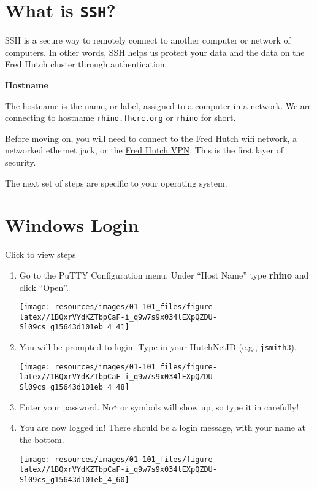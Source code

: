 \documentclass[
]{book}
\begin{document}
\hypertarget{what-is-ssh}{%
\section{\texorpdfstring{What is \texttt{SSH}?}{What is SSH?}}\label{what-is-ssh}}

SSH is a secure way to remotely connect to another computer or network of computers. In other words, SSH helps us protect your data and the data on the Fred Hutch cluster through authentication.

\textbf{Hostname}

The hostname is the name, or label, assigned to a computer in a network. We are connecting to hostname \texttt{rhino.fhcrc.org} or \texttt{rhino} for short.

Before moving on, you will need to connect to the Fred Hutch wifi network, a networked ethernet jack, or the \href{https://centernet.fredhutch.org/cn/u/center-it/help-desk/vpn.html}{Fred Hutch VPN}. This is the first layer of security.

The next set of steps are specific to your operating system.

\hypertarget{windows-login}{%
\section{Windows Login}\label{windows-login}}

Click to view steps

\begin{enumerate}
\def\labelenumi{\arabic{enumi}.}
\item
  Go to the PuTTY Configuration menu. Under ``Host Name'' type \textbf{rhino} and click ``Open''.

  \texttt{[image: resources/images/01-101\_files/figure-latex//1BQxrVYdKZTbpCaF-i\_q9w7s9x034lEXpQZDU-Sl09cs\_g15643d101eb\_4\_41]}
\item
  You will be prompted to login. Type in your HutchNetID (e.g., \texttt{jsmith3}).

  \texttt{[image: resources/images/01-101\_files/figure-latex//1BQxrVYdKZTbpCaF-i\_q9w7s9x034lEXpQZDU-Sl09cs\_g15643d101eb\_4\_48]}
\item
  Enter your password. No\texttt{*} or symbols will show up, so type it in carefully!
\item
  You are now logged in! There should be a login message, with your name at the bottom.

  \texttt{[image: resources/images/01-101\_files/figure-latex//1BQxrVYdKZTbpCaF-i\_q9w7s9x034lEXpQZDU-Sl09cs\_g15643d101eb\_4\_60]}
\end{enumerate}
\end{document}
